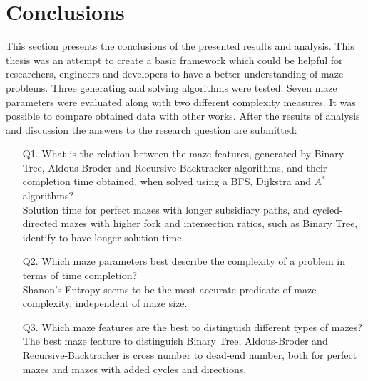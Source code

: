\section{Conclusions}
This section presents the conclusions of the presented results and analysis. This thesis was an attempt to create a basic framework which could be helpful
for researchers, engineers and developers to have a better understanding of maze problems. Three generating and solving algorithms were tested. Seven 
maze parameters were evaluated along with two different complexity measures. It was possible to compare obtained data with other works. After the results of analysis and 
discussion the answers to the research question are submitted:
\begin{enumerate}
    \item [Q1.] What is the relation between the maze features, generated by Binary Tree, Aldous-Broder and Recursive-Backtracker algorithms,
     and their completion time obtained, when solved using a BFS, Dijkstra and $A^*$ algorithms?\\
     Solution time for perfect mazes with longer subsidiary paths, and cycled-directed mazes with higher fork and intersection ratios, such as Binary Tree,
     identify to have longer solution time.
    \item [Q2.] Which maze parameters best describe the complexity of a problem in terms of time completion?\\
    Shanon's Entropy seems to be the most accurate predicate of maze complexity, independent of maze size. 
    \item [Q3.] Which maze features are the best to distinguish different types of mazes?\\
    The best maze feature to distinguish Binary Tree, Aldous-Broder and Recursive-Backtracker is cross number to dead-end number, both 
    for perfect mazes and mazes with added cycles and directions.
\end{enumerate} 

